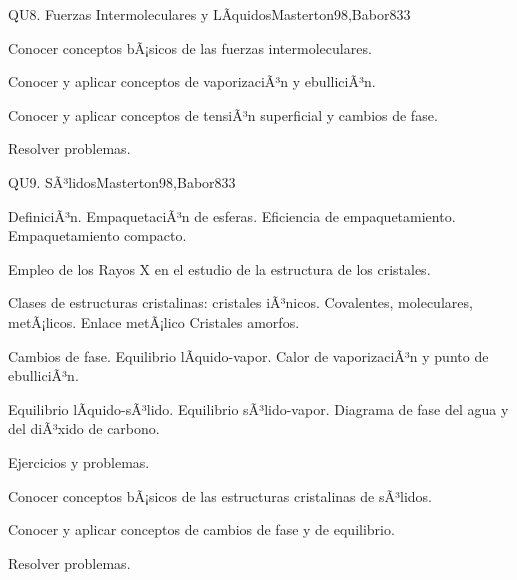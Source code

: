 \begin{syllabus}
\begin{unit}{QU8. Fuerzas Intermoleculares y LÃ­quidos}{Masterton98,Babor83}{3}
   \begin{unitgoals}
      \item Conocer conceptos bÃ¡sicos de las fuerzas intermoleculares.
      \item Conocer y aplicar conceptos de vaporizaciÃ³n y ebulliciÃ³n.
      \item Conocer y aplicar conceptos de tensiÃ³n superficial y cambios de fase.
      \item Resolver problemas.
   \end{unitgoals}
\end{unit}

\begin{unit}{QU9. SÃ³lidos}{Masterton98,Babor83}{3}
\begin{topics}
      \item DefiniciÃ³n. EmpaquetaciÃ³n de esferas. Eficiencia de empaquetamiento. Empaquetamiento compacto.
      \item Empleo de los Rayos X en el estudio de la estructura de los cristales.
      \item Clases de estructuras cristalinas: cristales iÃ³nicos. Covalentes, moleculares, metÃ¡licos. Enlace metÃ¡lico Cristales amorfos.
      \item Cambios de fase. Equilibrio lÃ­quido-vapor. Calor de vaporizaciÃ³n y punto de ebulliciÃ³n.
      \item Equilibrio lÃ­quido-sÃ³lido. Equilibrio sÃ³lido-vapor. Diagrama de fase  del agua y del diÃ³xido de carbono.
      \item Ejercicios y problemas.
    \end{topics}

   \begin{unitgoals}
      \item Conocer conceptos bÃ¡sicos de las estructuras cristalinas de sÃ³lidos.
      \item Conocer y aplicar conceptos de cambios de fase y de equilibrio.
      \item Resolver problemas.
   \end{unitgoals}
\end{unit}


\end{syllabus}
